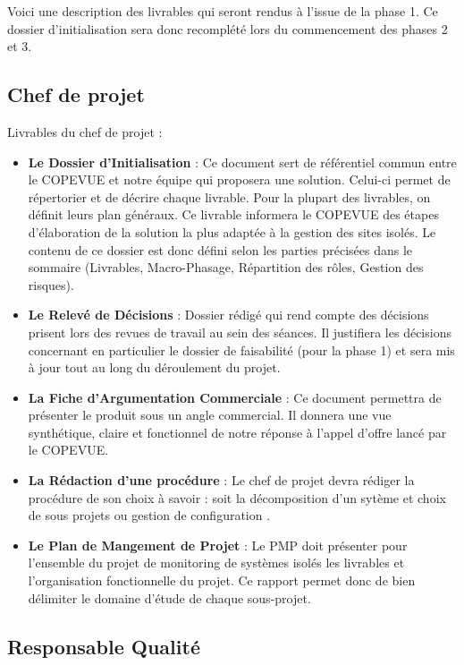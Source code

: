 Voici une description des livrables qui seront rendus à l'issue de la phase 1. Ce dossier d'initialisation sera donc recomplété lors du commencement des phases 2 et 3.

    \subsection{Chef de projet}

Livrables du chef de projet :

\begin{itemize}
\item \textbf{Le Dossier d'Initialisation} : Ce document sert de référentiel commun entre le COPEVUE et notre équipe qui proposera une solution. Celui-ci permet de répertorier et de décrire chaque livrable. Pour la plupart des livrables, on définit leurs plan généraux. Ce livrable informera le COPEVUE des étapes d'élaboration de la solution la plus adaptée à la gestion des sites isolés. Le contenu de ce dossier est donc défini selon les parties précisées dans le sommaire (Livrables, Macro-Phasage, Répartition des rôles, Gestion des risques).
\item \textbf{Le Relevé de Décisions} : Dossier rédigé qui rend compte des décisions prisent lors des revues de travail au sein des séances. Il justifiera les décisions concernant en particulier le dossier de faisabilité (pour la phase 1) et sera mis à jour tout au long du déroulement du projet.
\item \textbf{La Fiche d'Argumentation Commerciale} : Ce document permettra de présenter le produit sous un angle commercial. Il donnera une vue synthétique, claire et fonctionnel de notre réponse à l'appel d'offre lancé par le COPEVUE.
\item \textbf{La Rédaction d'une procédure} : Le chef de projet devra rédiger la procédure de son choix à savoir : soit la \og décomposition d'un sytème et choix de sous projets \fg ou \og gestion de configuration \fg.
\item \textbf{Le Plan de Mangement de Projet} : Le PMP doit présenter pour l'ensemble du projet de monitoring de systèmes isolés les livrables et l'organisation fonctionnelle du projet. Ce rapport permet donc de bien délimiter le domaine d'étude de chaque sous-projet.
\end{itemize}

    \subsection{Responsable Qualité}

